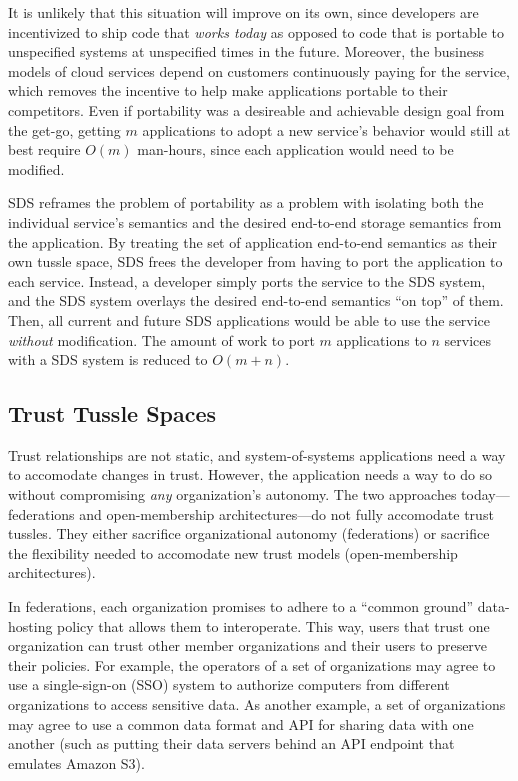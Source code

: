 It is unlikely that this situation will improve on its own,
since developers are incentivized to ship code that \emph{works
today} as opposed to code that is portable to unspecified systems at unspecified
times in the future.  Moreover, the business models of cloud services
depend on customers continuously paying for the service, which removes the
incentive to help make applications portable to their competitors.
Even if portability was a desireable and achievable design goal from the get-go,
getting $m$ applications to adopt a new service's behavior would still at best
require $O(m)$ man-hours, since each application would need to be modified.

SDS reframes the problem of portability as a problem with isolating
both the individual service's semantics and the desired end-to-end storage
semantics from the application.  By treating the set of application
end-to-end semantics as their own tussle space, SDS frees the developer from
having to port the application to each service.  Instead, a developer simply
ports the service to the SDS system, and the SDS system overlays the desired
end-to-end semantics ``on top'' of them.  Then, all current and future SDS
applications would be able to use the service \emph{without} modification.
The amount of work to port $m$ applications to $n$ services with a SDS system is reduced to
$O(m+n)$.

\subsection{Trust Tussle Spaces}

Trust relationships are not static, and system-of-systems applications need a
way to accomodate changes in trust.  However, the application needs a way to do
so without compromising \emph{any} organization's autonomy.  
The two approaches today---federations and open-membership
architectures---do not fully accomodate trust tussles.  They 
either sacrifice organizational autonomy (federations) or sacrifice 
the flexibility needed to accomodate new trust models (open-membership
architectures).

In federations, each organization promises to adhere to a
``common ground'' data-hosting policy that allows them to interoperate.
This way, users that trust one organization can trust other member organizations
and their users to preserve their policies.
For example, the operators of a set of organizations may agree to use a
single-sign-on (SSO) system to authorize computers from different organizations
to access sensitive data.  As another example, a set of organizations may agree
to use a common data format and API for sharing data with one another (such as
putting their data servers behind an API endpoint that emulates Amazon S3).


